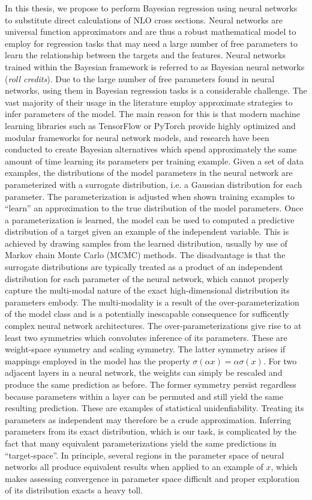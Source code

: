 In this thesis, we propose to perform Bayesian regression using neural networks to substitute direct calculations of NLO cross sections. Neural networks are universal function approximators \cite{universal_function_approximator} and are thus a robust mathematical model to employ for regression tasks that may need a large number of free parameters to learn the relationship between the targets and the features.
Neural networks trained within the Bayesian framework is referred to as Bayesian neural networks (\textit{roll credits}). Due to the large number of free parameters found in neural networks, using them in Bayesian regression tasks is a considerable challenge. The vast majority of their usage in the literature employ approximate strategies to infer parameters of the model. The main reason for this is that modern machine learning libraries such as TensorFlow or PyTorch provide highly optimized and modular frameworks for neural network models, and research have been conducted to create Bayesian alternatives which spend approximately the same amount of time learning its parameters per training example. Given a set of data examples, the distributions of the model parameters in the neural network are parameterized with a surrogate distribution, i.e. a Gaussian distribution for each parameter. The parameterization is adjusted when shown training examples to ``learn'' an approximation to the true distribution of the model parameters. Once a parameterization is learned, the model can be used to computed a predictive distribution of a target given an example of the independent variable. This is achieved by drawing samples from the learned distribution, usually by use of Markov chain Monte Carlo (MCMC) methods. The disadvantage is that the surrogate distributions are typically treated as a product of an independent distribution for each parameter of the neural network, which cannot properly capture the multi-modal nature of the exact high-dimensional distribution its parameters embody. The multi-modality is a result of the over-parameterization of the model class and is a potentially inescapable consequence for sufficently complex neural network architectures. The over-parameterizations give rise to at least two symmetries which convolutes inference of its parameters. These are weight-space symmetry and scaling symmetry. The latter symmetry arises if mappings employed in the model has the property $\sigma(\alpha x) = \alpha \sigma(x)$. For two adjacent layers in a neural network, the weights can simply be rescaled and produce the same prediction as before. The former symmetry persist regardless because parameters within a layer can be permuted and still yield the same resulting prediction. These are examples of statistical unidenfiability. Treating its parameters as independent may therefore be a crude approximation. Inferring parameters from its exact distribution, which is our task, is complicated by the fact that many equivalent parameterizations yield the same predictions in ``target-space''. In principle, several regions in the parameter space of neural networks all produce equivalent results when applied to an example of $x$, which makes assessing convergence in parameter space difficult and proper exploration of its distribution exacts a heavy toll.

